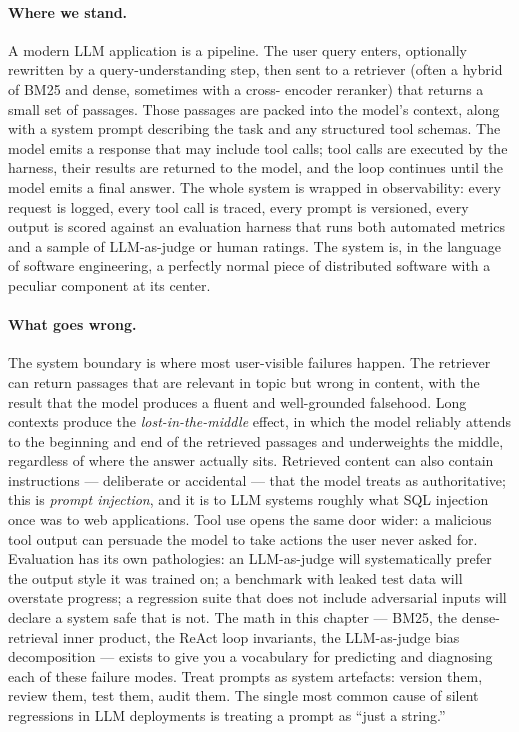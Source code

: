 \paragraph{Where we stand.}
A modern LLM application is a pipeline. The user query enters,
optionally rewritten by a query-understanding step, then sent to a
retriever (often a hybrid of BM25 and dense, sometimes with a cross-
encoder reranker) that returns a small set of passages. Those
passages are packed into the model's context, along with a system
prompt describing the task and any structured tool schemas. The
model emits a response that may include tool calls; tool calls are
executed by the harness, their results are returned to the model,
and the loop continues until the model emits a final answer. The
whole system is wrapped in observability: every request is logged,
every tool call is traced, every prompt is versioned, every output
is scored against an evaluation harness that runs both automated
metrics and a sample of LLM-as-judge or human ratings. The system
is, in the language of software engineering, a perfectly normal
piece of distributed software with a peculiar component at its
center.

\paragraph{What goes wrong.}
The system boundary is where most user-visible failures happen.
The retriever can return passages that are relevant in topic but
wrong in content, with the result that the model produces a
fluent and well-grounded falsehood. Long contexts produce the
\emph{lost-in-the-middle} effect, in which the model reliably
attends to the beginning and end of the retrieved passages and
underweights the middle, regardless of where the answer actually
sits. Retrieved content can also contain instructions ---
deliberate or accidental --- that the model treats as authoritative;
this is \emph{prompt injection}, and it is to LLM systems roughly
what SQL injection once was to web applications. Tool use opens
the same door wider: a malicious tool output can persuade the
model to take actions the user never asked for. Evaluation has its
own pathologies: an LLM-as-judge will systematically prefer the
output style it was trained on; a benchmark with leaked test data
will overstate progress; a regression suite that does not include
adversarial inputs will declare a system safe that is not. The
math in this chapter --- BM25, the dense-retrieval inner product,
the ReAct loop invariants, the LLM-as-judge bias decomposition ---
exists to give you a vocabulary for predicting and diagnosing each
of these failure modes. Treat prompts as system artefacts: version
them, review them, test them, audit them. The single most common
cause of silent regressions in LLM deployments is treating a prompt
as ``just a string.''

